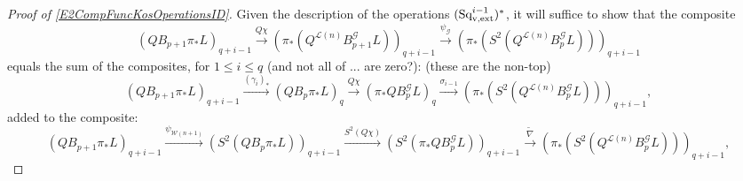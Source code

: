 \documentclass[11pt]{amsart}
\theoremstyle{plain}
\theoremstyle{definition}
\renewcommand{\to}{\longrightarrow}
\newcommand{\scrG}{\mathscr{G}}
\newcommand{\calW}{\mathcal{W}}
\newcommand{\calL}{\mathcal{L}}
\theoremstyle{plain}
\newcommand{\BSW}{{\scrG}}
\newcommand{\BSWres}{B^\BSW}%
\newcommand{\vExtCohOp}{\textup{Sq}_\textup{v,ext}}
\begin{document}
\begin{Operations in composite functor spectral sequences}
\begin{proof}[Proof of \ref{E2CompFuncKosOperationsID}]
Given the description of the operations $(\vExtCohOp^{i-1})^*$, it will suffice to show that the composite
\[(QB_{p+1}\pi_*L)_{q+i-1}\overset{Q\chi}{\to}(\pi_*(Q^{\calL(n)}\BSWres_{p+1}L))_{q+i-1}\overset{\psi_{\BSW}}{\to}(\pi_*(S^2(Q^{\calL(n)}\BSWres_pL)))_{q+i-1}\]
equals the sum of the composites, for $1\leq i \leq q$ (and not all of ... are zero?): (these are the non-top)
\[(QB_{p+1}\pi_* L)_{q+i-1}\overset{(\gamma_i)_*}{\to} (QB_{p}\pi_* L)_q\overset{Q\chi}{\to} (\pi_*Q\BSWres_{p}L)_q\overset{\sigma_{i-1}}{\to} (\pi_*(S^2(Q^{\calL(n)}\BSWres_{p}L)))_{q+i-1},\]
added to the composite:
\[(QB_{p+1}\pi_* L)_{q+i-1}\overset{\psi_{\calW(n+1)}}{\to}(S^2(QB_{p}\pi_* L))_{q+i-1}\overset{S^2(Q\chi)}{\to}
(S^2(\pi_*Q\BSWres_pL))_{q+i-1}\overset{\widetilde{\nabla}}{\to}
(\pi_*(S^2(Q^{\calL(n)}\BSWres_{p}L)))_{q+i-1},\]



\end{proof}
\end{Operations in composite functor spectral sequences}
\end{document}
